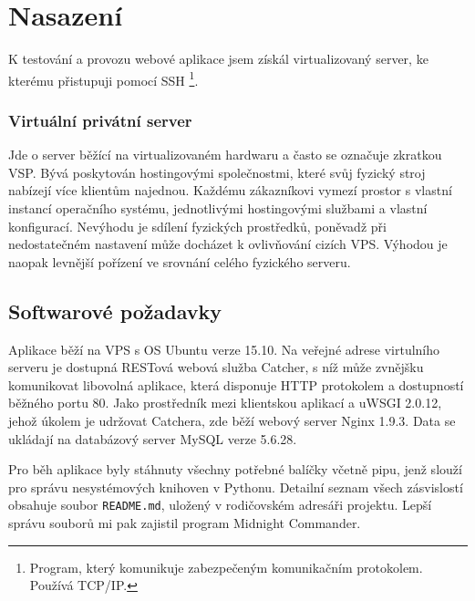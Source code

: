 \chapter{Nasazení}

\indent

K testování a provozu webové aplikace jsem získál virtualizovaný server, ke kterému přistupuji pomocí SSH
\footnote{Program, který komunikuje zabezpečeným komunikačním protokolem. Používá TCP/IP.}.

\subsection*{Virtuální privátní server}

\indent

Jde o server běžící na virtualizovaném hardwaru a často se označuje zkratkou VSP.
Bývá poskytován hostingovými společnostmi, které svůj fyzický stroj nabízejí více klientům najednou.
Každému zákazníkovi vymezí prostor s vlastní instancí operačního systému, jednotlivými hostingovými službami
a vlastní konfigurací. Nevýhodu je sdílení fyzických prostředků, poněvadž při nedostatečném nastavení
může docházet k ovlivňování cizích VPS. Výhodou je naopak levnější pořízení ve srovnání celého fyzického serveru.

\section{Softwarové požadavky}

\indent

Aplikace běží na VPS s OS Ubuntu verze 15.10. Na veřejné adrese virtulního serveru
je dostupná RESTová webová služba Catcher, s níž může zvnějšku komunikovat libovolná aplikace,
která disponuje HTTP protokolem a dostupností běžného portu 80. Jako prostředník mezi klientskou aplikací
a uWSGI 2.0.12, jehož úkolem je udržovat Catchera, zde běží webový server Nginx 1.9.3.
Data se ukládají na databázový server MySQL verze 5.6.28.

\medskip

Pro běh aplikace byly stáhnuty všechny potřebné balíčky včetně pipu,
jenž slouží pro správu nesystémových knihoven v Pythonu. Detailní seznam všech zásvislostí obsahuje soubor
\texttt{README.md}, uložený v rodičovském adresáři projektu. Lepší správu souborů mi pak zajistil program Midnight Commander.

